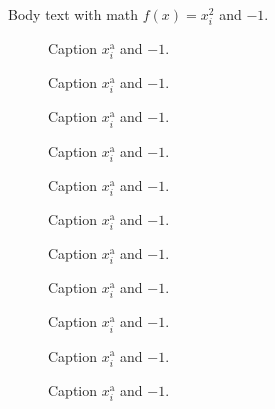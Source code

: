 \documentclass{article}
\begin{document}
Body text with math $f(x) = x_{i}^{2}$ and $-1$.

\begin{figure}[htbp]
  \centering
  \caption{Caption $x_{i}^{\text{a}}$ and $-1$.}
\end{figure}
\clearpage

\begin{figure}[htbp]
  \centering
  \caption{Caption $x_{i}^{\text{a}}$ and $-1$.}
\end{figure}
\clearpage

\begin{figure}[htbp]
  \centering
  \caption{Caption $x_{i}^{\text{a}}$ and $-1$.}
\end{figure}
\clearpage

\begin{figure}[htbp]
  \centering
  \caption{Caption $x_{i}^{\text{a}}$ and $-1$.}
\end{figure}
\clearpage

\begin{figure}[htbp]
  \centering
  \caption{Caption $x_{i}^{\text{a}}$ and $-1$.}
\end{figure}
\clearpage

\begin{figure}[htbp]
  \centering
  \caption{Caption $x_{i}^{\text{a}}$ and $-1$.}
\end{figure}
\clearpage

\begin{figure}[htbp]
  \centering
  \caption{Caption $x_{i}^{\text{a}}$ and $-1$.}
\end{figure}
\clearpage

\begin{figure}[htbp]
  \centering
  \caption{Caption $x_{i}^{\text{a}}$ and $-1$.}
\end{figure}
\clearpage

\begin{figure}[htbp]
  \centering
  \caption{Caption $x_{i}^{\text{a}}$ and $-1$.}
\end{figure}
\clearpage

\begin{figure}[htbp]
  \centering
  \caption{Caption $x_{i}^{\text{a}}$ and $-1$.}
\end{figure}
\clearpage

\begin{figure}[htbp]
  \centering
  \caption{Caption $x_{i}^{\text{a}}$ and $-1$.}
\end{figure}
\clearpage
\end{document}
